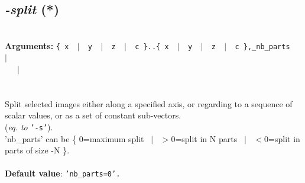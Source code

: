 \documentclass[a4paper,11pt,twoside]{book}
\begin{document}
\subsection{\emph{-split} (*)}\vspace*{-0.5em}
~\\\textbf{Arguments: } 
{\small \texttt{\{ x ~$|$~ y ~$|$~ z ~$|$~ c \}..\{ x ~$|$~ y ~$|$~ z ~$|$~ c \},\_nb\_parts}}~~~$|$\\
~~~$|$\\
\\~\\
Split selected images either along a specified axis, or regarding to a sequence of scalar values, or as a set of constant sub-vectors.
~\\(\emph{eq. to} {\small \texttt{'-s'}}).
~\\'nb\_parts' can be \{ 0=maximum split ~$|$~ $>$0=split in N parts ~$|$~ $<$0=split in parts of size -N \}.
~\\~\\\textbf{Default value}: {\small \texttt{'nb\_parts=0'.}}
\end{document}
